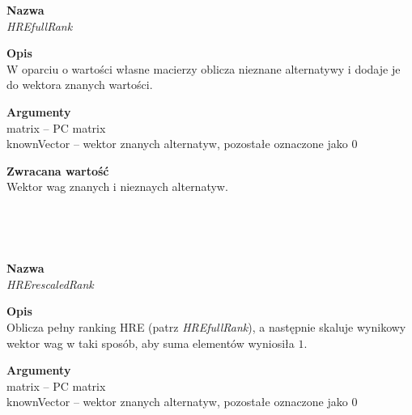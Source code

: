 \begin{spacing}{1.0}
\begin{spacing}{1.2}
\begin{spacing}{1.2}
\begin{spacing}{1.2}
\textbf{Nazwa}\\  \emph{HREfullRank} \\ \begin{spacing}{0.3}  \end{spacing}
 
\textbf{Opis}\\ W oparciu o wartości własne macierzy oblicza nieznane alternatywy i dodaje je do wektora znanych wartości. \\  \begin{spacing}{0.3}  \end{spacing}
 
\textbf{Argumenty} \\
matrix -- PC matrix \\
knownVector -- wektor znanych alternatyw, pozostałe oznaczone jako $0$ \\ \begin{spacing}{0.3}  \end{spacing}

\textbf{Zwracana wartość}\\ Wektor wag znanych i nieznaych alternatyw.\\ \begin{spacing}{0.3}  \end{spacing}\\

\newpage 
\begin{spacing}{1.1}
 \\ \begin{spacing}{0.5}  \end{spacing}

\textbf{Nazwa}\\ \emph{HRErescaledRank} \\ \begin{spacing}{0.3}  \end{spacing}
 
\textbf{Opis}\\ Oblicza pełny ranking HRE (patrz \textit{HREfullRank}), a następnie skaluje wynikowy wektor wag w taki sposób, aby suma elementów wyniosiła $1$. \\  \begin{spacing}{0.3}  \end{spacing}
 
\textbf{Argumenty} \\
matrix -- PC matrix \\
knownVector -- wektor znanych alternatyw, pozostałe oznaczone jako $0$ \\ \begin{spacing}{0.3}  \end{spacing}


\end{spacing}
\end{spacing}
\end{spacing}
\end{spacing}
\end{spacing}
